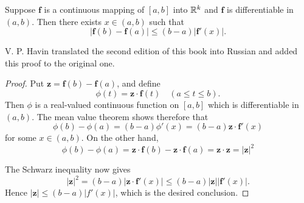 \begin{thm}
    \label{thm:5.19}
    Suppose $\mathbf{f}$ is a  continuous mapping of $[a, b]$ into ${\protect\mathbb R}^k$ 
    and $\mathbf{f}$ is differentiable in $(a, b)$. 
    Then there exists $x \in (a, b)$ such that
    \begin{equation*}
        \left| \mathbf{f}(b) - \mathbf{f}(a) \right| \leq
        (b-a) \left| \mathbf{f}'(x) \right| .
    \end{equation*}
\end{thm}


V. P. Havin translated the second edition of this book into Russian and added this proof to the original one.
\begin{proof}
    Put $\mathbf{z} = \mathbf{f}(b) - \mathbf{f}(a)$, and define
    \begin{equation*}
        \phi( t ) = \mathbf{z} \cdot \mathbf{f}( t)
        \quad (a \leq t \leq b).
    \end{equation*}
    Then $\phi$ is a real-valued continuous function on $[a, b]$ which is differentiable in $(a, b)$. 
    The mean value theorem shows therefore that 
    \begin{equation*}
        \phi(b) - \phi(a) 
        = (b - a)\phi'(x) 
        = (b - a)\mathbf{z} \cdot \mathbf{f}'(x)        
    \end{equation*}
    for some $x \in (a, b)$. 
    On the other hand,
    \begin{equation*}
        \phi( b) - \phi( a) 
        = \mathbf{z} \cdot \mathbf{f}( b) - \mathbf{z} \cdot \mathbf{f}( a) 
        = \mathbf{z} \cdot \mathbf{z} 
        = \left|  \mathbf{z}  \right|^2 
    \end{equation*}
    
    The Schwarz inequality now gives
    \begin{equation*}
        \left| \mathbf{z} \right|^2 
        = (b - a) \left| \mathbf{z} \cdot \mathbf{f}' ( x) \right| 
        \leq ( b - a) \left| \mathbf{z} \right| \left| \mathbf{f}'(x) \right| .
    \end{equation*}
    Hence $\left| \mathbf{z} \right| \leq (b - a) \left| f'(x) \right|$, which is the desired conclusion.
\end{proof}